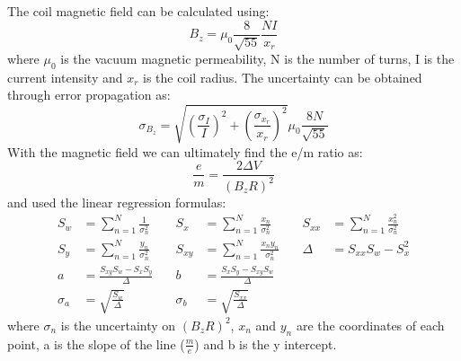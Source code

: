The coil magnetic field can be calculated using:
\begin{equation*}
    B_z=\mu_0\frac{8}{\sqrt{55}}\frac{NI}{x_r}
\end{equation*}
where $\mu_0$ is the vacuum magnetic permeability, N is the number of turns, I is the current intensity and $x_r$ is the coil radius. The uncertainty can be obtained through error propagation as:
\begin{equation*}
    \sigma_{B_z}=\sqrt{(\frac{\sigma_I}{I})^2+(\frac{\sigma_{x_r}}{x_r})^2}\mu_0\frac{8N}{\sqrt{55}}
\end{equation*}
With the magnetic field we can ultimately find the e/m ratio as:
\begin{equation*}
    \frac{e}{m}=\frac{2\Delta V}{(B_zR)^2}
\end{equation*}
and used the linear regression formulas:
\begin{align*}
S_w &= \sum_{n=1}^N \frac{1}{\sigma_n^2} & \quad S_x &= \sum_{n=1}^N \frac{x_n}{\sigma_n^2} & \quad S_{xx} &= \sum_{n=1}^N \frac{x_n^2}{\sigma_n^2} \\
S_y &= \sum_{n=1}^N \frac{y_n}{\sigma_n^2} & \quad S_{xy} &= \sum_{n=1}^N \frac{x_n y_n}{\sigma_n^2}  & \quad \Delta &= S_{xx} S_w - S_x^2 \\
a &= \frac{S_{xy} S_w - S_x S_y}{\Delta} & \quad b &= \frac{S_x S_y - S_{xy} S_w}{\Delta} \\
\sigma_a &= \sqrt{\frac{S_w}{\Delta}} & \quad \sigma_b &= \sqrt{\frac{S_{xx}}{\Delta}} 
\end{align*}
where  $\sigma_n$ is the uncertainty on $(B_zR)^2$, $x_n$ and  $y_n$ are the coordinates of each point, a is the slope of the line ($\frac{m}{e}$) and b is the y intercept.
